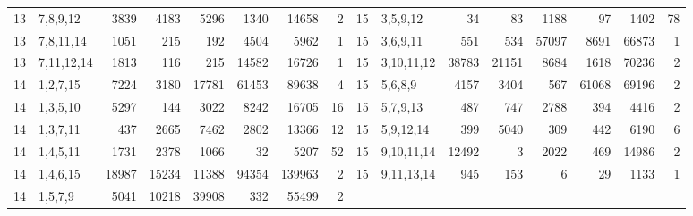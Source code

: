 \begin{table}[tp]
\begin{ruledtabular}
\begin{tabular}{rlrrrrrr@{\hspace{2.2em}}rlrrrrrr}
13 & 7,8,9,12 & 3839 & 4183 & 5296 & 1340 & 14658 & 2 & 15 & 3,5,9,12 & 34 & 83 & 1188 & 97 & 1402 & 78 \\
13 & 7,8,11,14 & 1051 & 215 & 192 & 4504 & 5962 & 1 & 15 & 3,6,9,11 & 551 & 534 & 57097 & 8691 & 66873 & 1 \\
13 & 7,11,12,14 & 1813 & 116 & 215 & 14582 & 16726 & 1 & 15 & 3,10,11,12 & 38783 & 21151 & 8684 & 1618 & 70236 & 2 \\
14 & 1,2,7,15 & 7224 & 3180 & 17781 & 61453 & 89638 & 4 & 15 & 5,6,8,9 & 4157 & 3404 & 567 & 61068 & 69196 & 2 \\
14 & 1,3,5,10 & 5297 & 144 & 3022 & 8242 & 16705 & 16 & 15 & 5,7,9,13 & 487 & 747 & 2788 & 394 & 4416 & 2 \\
14 & 1,3,7,11 & 437 & 2665 & 7462 & 2802 & 13366 & 12 & 15 & 5,9,12,14 & 399 & 5040 & 309 & 442 & 6190 & 6 \\
14 & 1,4,5,11 & 1731 & 2378 & 1066 & 32 & 5207 & 52 & 15 & 9,10,11,14 & 12492 & 3 & 2022 & 469 & 14986 & 2 \\
14 & 1,4,6,15 & 18987 & 15234 & 11388 & 94354 & 139963 & 2 & 15 & 9,11,13,14 & 945 & 153 & 6 & 29 & 1133 & 1 \\
14 & 1,5,7,9 & 5041 & 10218 & 39908 & 332 & 55499 & 2 &  &  &  &  &  &  &  &  \\
\end{tabular}
\end{ruledtabular}
\end{table}
